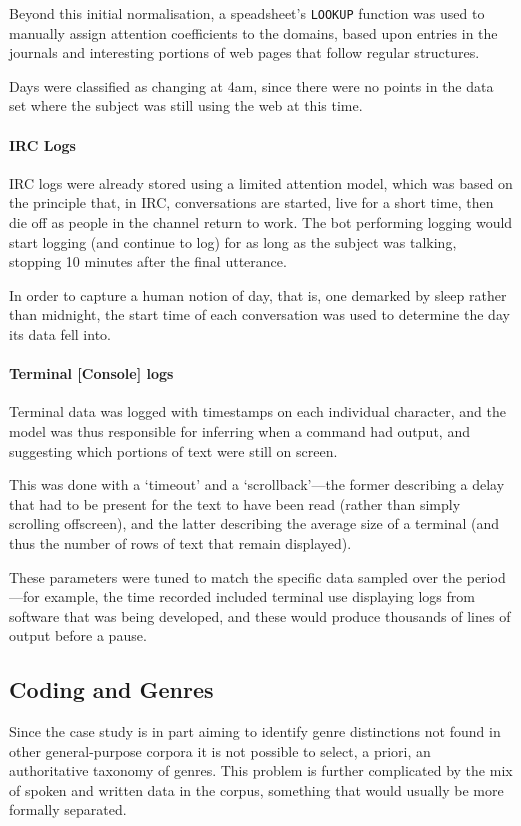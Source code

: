 Beyond this initial normalisation, a speadsheet's \texttt{LOOKUP} function was used to manually assign attention coefficients to the domains, based upon entries in the journals and interesting portions of web pages that follow regular structures.

Days were classified as changing at 4am, since there were no points in the data set where the subject was still using the web at this time.



\paragraph{IRC Logs}
IRC logs were already stored using a limited attention model, which was based on the principle that, in IRC, conversations are started, live for a short time, then die off as people in the channel return to work.  The bot performing logging would start logging (and continue to log) for as long as the subject was talking, stopping 10 minutes after the final utterance.

In order to capture a human notion of day, that is, one demarked by sleep rather than midnight, the start time of each conversation was used to determine the day its data fell into.



\paragraph{Terminal [Console] logs}
Terminal data was logged with timestamps on each individual character, and the model was thus responsible for inferring when a command had output, and suggesting which portions of text were still on screen.

This was done with a `timeout' and a `scrollback'---the former describing a delay that had to be present for the text to have been read (rather than simply scrolling offscreen), and the latter describing the average size of a terminal (and thus the number of rows of text that remain displayed).

These parameters were tuned to match the specific data sampled over the period---for example, the time recorded included terminal use displaying logs from software that was being developed, and these would produce thousands of lines of output before a pause.




\subsection{Coding and Genres}
Since the case study is in part aiming to identify genre distinctions not found in other general-purpose corpora it is not possible to select, a priori, an authoritative taxonomy of genres.  This problem is further complicated by the mix of spoken and written data in the corpus, something that would usually be more formally separated.

